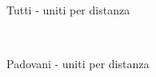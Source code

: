 \documentclass[12pt,a4paper,twoside]{report}
\begin{document}
\begin{figure}[ht]
\begin{subfigure}[b]{0.5\textwidth}
                \caption{Tutti - uniti per distanza}
            \end{subfigure}%
            ~
            \begin{subfigure}[b]{0.5\textwidth}
                \centering
                \setlength{\fboxrule}{0pt} %
                \caption{Padovani - uniti per distanza}
            \end{subfigure}%
            \\
            \begin{subfigure}[b]{0.5\textwidth}
                \centering
                \setlength{\fboxrule}{0pt} %

\end{subfigure}
\end{figure}
\end{document}
